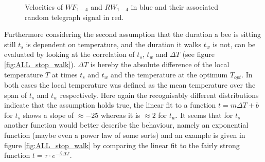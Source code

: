 \begin{figure}%
    \centering
    \caption{Velocities of $WF_{1-4}$ and $RW_{1-4}$ in blue and their associated random telegraph signal in red.}
    \label{fig:RTS_second}
    \vspace{-15mm}
\end{figure}

Furthermore considering the second assumption that the duration a bee is sitting still $t_{s}$ is dependent on temperature, and the duration it walks $t_{w}$ is not, can be evaluated by looking at the correlation of $t_{s}$, $t_{w}$ and $\Delta T$ (see figure \ref{fig:ALL_stop_walk}).
$\Delta T$ is hereby the absolute difference of the local temperature $T$ at times $t_{s}$ and $t_{w}$ and the temperature at the optimum $T_{opt}$. In both cases the local temperature was defined as the mean temperature over the span of $t_{s}$ and $t_{w}$ respectively. 
Here again the recognisably different distributions indicate that the assumption holds true, the linear fit to a function $t = m \Delta T + b$ for $t_{s}$ shows a slope of $\approx -25$ whereas it is $\approx 2$ for $t_{w}$. It seems that for $t_{s}$ another function would better describe the behaviour, namely an exponential function (maybe even a power law of some sorts) and an example is given in figure \ref{fig:ALL_stop_walk} by comparing the linear fit to the fairly strong function $t = \tau \cdot e^{-\beta \Delta T}$. 

